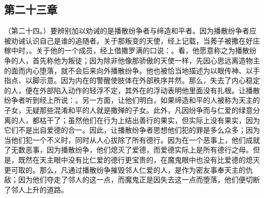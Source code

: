 
\subsection{第二十三章}

\par

（第二十四。）要辨别加以劝诫的是播散纷争者与缔造和平者。因为播散纷争者应被劝诫认识自己是谁的追随者。关于那叛变的天使，经上记载，当莠子被撒在好庄稼中时，。关于他的一个成员，经上借撒罗满的口说：。看，他愿意称之为播散纷争的人，首先称他为叛徒；因为除非他像那骄傲的天使一样，先因心思远离造物主的面而内心堕落，就不会后来向外播散纷争。他也被恰当地描述为以眼传神、以手指点、以脚示意。因为内在的警醒使肢体在外部秩序井然。那么，失去了内心稳定的人，便在外部陷入动作的轻浮不定，其外在的浮动表明他里面没有扎根。让播散纷争者听到经上所说：。另一方面，让他们明白，如果缔造和平的人被称为天主的子女，无疑那些混淆和平的人就是撒殚的子女。此外，凡因纷争而与仁爱的绿意分离的人，都枯干了；虽然他们在行为上结出善行的果实，但实际上没有果实，因为它们不是出自爱德的合一。因此，让播散纷争者思想他们犯的罪是多么众多；因为当他们犯一个不义时，同时从人心拔除了所有德行。因为在一个恶事上，他们成就了无数恶事，因为播散纷争，他们熄灭了爱德，而爱德实际上是所有德行之母。但是，既然在天主眼中没有比仁爱的德行更宝贵的，在魔鬼眼中也没有比爱德的熄灭更可取的。那么，凡通过播散纷争摧毁邻人仁爱的人，是作为密友事奉天主的仇敌；因为他们夺走了邻人的这一点，而魔鬼正是因失去这一点而堕落，他们便切断了邻人上升的道路。\par

